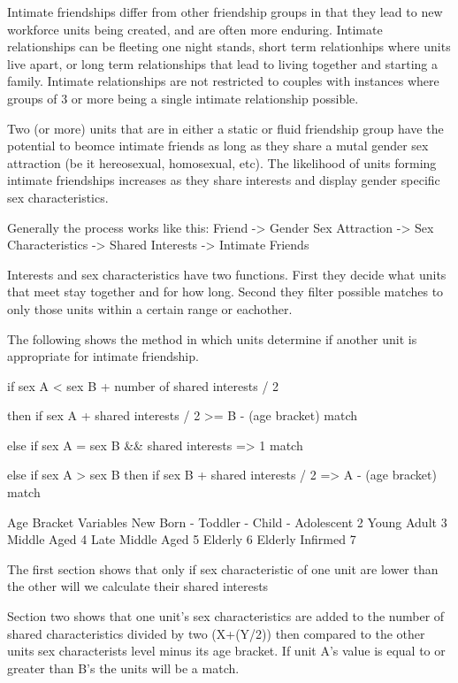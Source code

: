 
Intimate friendships differ from other friendship groups in that they lead to new workforce units being created, and are often more enduring. Intimate relationships can be fleeting one night stands, short term relationhips where units live apart, or long term relationships that lead to living together and starting a family. Intimate relationships are not restricted to couples with instances where groups of 3 or more being a single intimate relationship possible.   

Two (or more) units that are in either a static or fluid friendship group have the potential to beomce intimate friends as long as they share a mutal gender sex attraction (be it hereosexual, homosexual, etc). The likelihood of units forming intimate friendships increases as they share interests and display gender specific sex characteristics. 

Generally the process works like this: Friend -> Gender Sex Attraction -> Sex Characteristics -> Shared Interests -> Intimate Friends

Interests and sex characteristics have two functions. First they decide what units that meet stay together and for how long. Second they filter possible matches to only those units within a certain range or eachother.

The following shows the method in which units determine if another unit is appropriate for intimate friendship.

if sex A < sex B 
+ number of shared interests / 2 
 
 then
  if sex A + shared interests / 2 >= B - (age bracket)
  match

else if sex A = sex B && shared interests => 1
  match

else if sex A > sex B
 then
  if sex B + shared interests / 2 => A - (age bracket)
  match


Age Bracket Variables
New Born		-
Toddler			-
Child			-
Adolescent		2
Young Adult		3
Middle Aged		4
Late Middle Aged	5	
Elderly			6
Elderly Infirmed	7
	
The first section shows that only if sex characteristic of one unit are lower than the other will we calculate their shared interests

Section two shows that one unit's sex characteristics are added to the number of shared characteristics divided by two (X+(Y/2)) then compared to the other units sex characterists level minus its age bracket. If unit A's value is equal to or greater than B's the units will be a match. 

